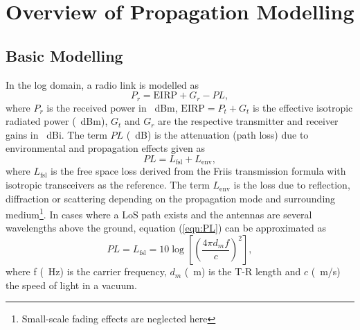 \documentclass[10pt,journal,twoside]{IEEEtran}
\begin{document}
\section{Overview of Propagation Modelling}\label{Overview of Propagation Modelling}
\subsection{Basic Modelling}
In the log domain, a radio link is modelled as
\begin{equation}
\label{eqn:Pr}
P_r = \text{EIRP} + G_r - PL,
\end{equation}
where $P_r$ is the received power in \SI{}{dBm}, $\text{EIRP} = P_t + G_t$ is the effective isotropic radiated power (\SI{}{dBm}), $G_t$ and $G_r$ are the respective transmitter and receiver gains in \SI{}{dBi}. The term $PL$ (\SI{}{dB}) is the attenuation (path loss) due to environmental and propagation effects given as
\begin{equation}
\label{eqn:PL}
PL = L_{\text{fsl}} + L_{\text{env}},
\end{equation}
where $L_{\text{fsl}}$ is the free space loss derived from the Friis transmission formula   %
with isotropic transceivers as the reference. The term $L_{\text{env}}$ is the loss due to reflection, diffraction or scattering depending on the propagation mode and surrounding medium\footnote{Small-scale fading effects are neglected here}. In cases where a LoS path exists and the antennas are several wavelengths above the ground, equation (\ref{eqn:PL}) can be approximated as 
\begin{equation}
\label{eqn:FSL}
PL = L_{\text{fsl}} = 10\log\left[ \left(\dfrac{4\pi d_mf}{c}\right)^2 \right],
\end{equation}
where f (\SI{}{Hz}) is the carrier frequency, $d_m$ (\SI{}{m}) is the T-R length and $c$ (\SI{}{m/s}) the speed of light in a vacuum.
\end{document}
